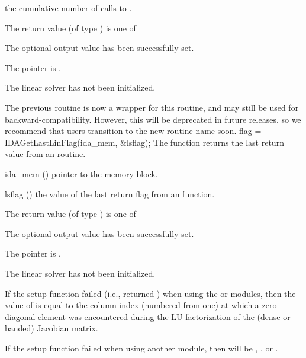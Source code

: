 {{\begin{args}[njvevals]
    the cumulative number of calls to .
  \end{args}
}
{
  The return value  (of type ) is one of
  \begin{args}
  \item[\Id{IDALS\_SUCCESS}]
    The optional output value has been successfully set.
  \item[\Id{IDALS\_MEM\_NULL}]
    The  pointer is .
  \item[\Id{IDALS\_LMEM\_NULL}]
    The {\idals} linear solver has not been initialized.
  \end{args}
}
{
  The previous routine  is now a wrapper for
  this routine, and may still be used for backward-compatibility.
  However, this will be deprecated in future releases, so we recommend
  that users transition to the new routine name soon.
}
{
  flag = IDAGetLastLinFlag(ida\_mem, \&lsflag);
}
{
  The function  returns the
  last return value from an {\idals} routine.
}
{
  \begin{args}
  \item[ida\_mem] ()
    pointer to the {\ida} memory block.
  \item[lsflag] ()
    the value of the last return flag from an {\idals} function.
  \end{args}
}
{
  The return value  (of type ) is one of
  \begin{args}
  \item[\Id{IDALS\_SUCCESS}]
    The optional output value has been successfully set.
  \item[\Id{IDALS\_MEM\_NULL}]
    The  pointer is .
  \item[\Id{IDALS\_LMEM\_NULL}]
    The {\idals} linear solver has not been initialized.
  \end{args}
}
{
  If the {\idals} setup function failed (i.e.,  returned
  ) when using the {\sunlinsoldense} or
  {\sunlinsolband} modules, then the value of  is equal to
  the column index (numbered from one) at which a zero diagonal
  element was encountered during the LU factorization of the (dense or
  banded) Jacobian matrix.

  If the {\idals} setup function failed when using another
  {\sunlinsol} module, then  will be
  , , or
  .

}}
